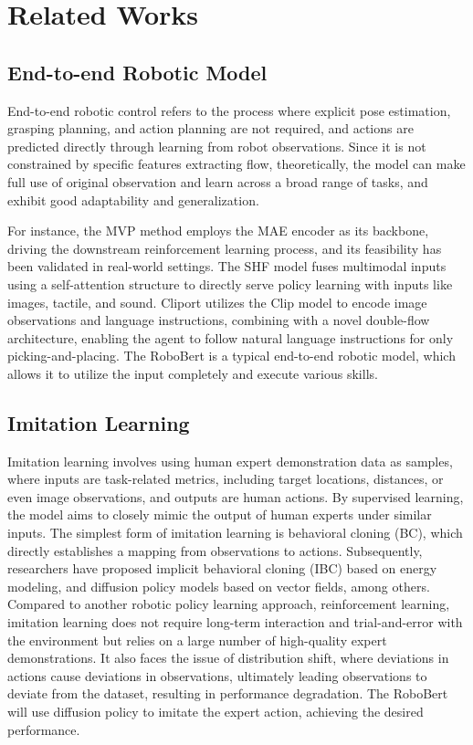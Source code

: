 \section{Related Works}
\subsection{End-to-end Robotic Model}
End-to-end robotic control refers to the process where explicit pose estimation, grasping planning, and action planning are not required, and actions are predicted directly through learning from robot observations\cite{A1}. Since it is not constrained by specific features extracting flow, theoretically, the model can make full use of original observation and learn across a broad range of tasks, and exhibit good adaptability and generalization. 

For instance, the MVP\cite{A1} method employs the MAE\cite{A2} encoder as its backbone, driving the downstream reinforcement learning process, and its feasibility has been validated in real-world settings\cite{A3}. The SHF\cite{A4} model fuses multimodal inputs using a self-attention structure to directly serve policy learning with inputs like images, tactile, and sound. Cliport\cite{A6} utilizes the Clip model to encode image observations and language instructions, combining with a novel double-flow architecture, enabling the agent to follow natural language instructions for only picking-and-placing. The RoboBert is a typical end-to-end robotic model, which allows it to utilize the input completely and execute various skills.

\subsection{Imitation Learning}
Imitation learning involves using human expert demonstration data as samples, where inputs are task-related metrics, including target locations, distances, or even image observations, and outputs are human actions. By supervised learning, the model aims to closely mimic the output of human experts under similar inputs. The simplest form of imitation learning is behavioral cloning (BC), which directly establishes a mapping from observations to actions. Subsequently, researchers have proposed implicit behavioral cloning (IBC)\cite{A28} based on energy modeling, and diffusion policy\cite{A29} models based on vector fields, among others. Compared to another robotic policy learning approach, reinforcement learning, imitation learning does not require long-term interaction and trial-and-error with the environment but relies on a large number of high-quality expert demonstrations. It also faces the issue of distribution shift, where deviations in actions cause deviations in observations, ultimately leading observations to deviate from the dataset, resulting in performance degradation. The RoboBert will use diffusion policy to imitate the expert action, achieving the desired performance.

